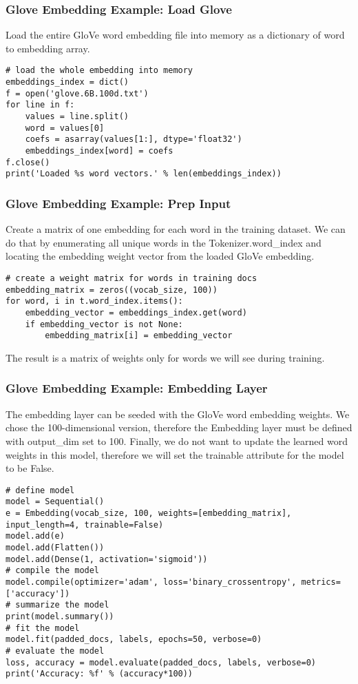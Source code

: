 \begin{frame}[fragile]\frametitle{Glove Embedding Example: Load Glove}

Load the entire GloVe word embedding file into memory as a dictionary of word to embedding array.

\begin{lstlisting}
# load the whole embedding into memory
embeddings_index = dict()
f = open('glove.6B.100d.txt')
for line in f:
	values = line.split()
	word = values[0]
	coefs = asarray(values[1:], dtype='float32')
	embeddings_index[word] = coefs
f.close()
print('Loaded %s word vectors.' % len(embeddings_index))
\end{lstlisting}
\end{frame}

\begin{frame}[fragile]\frametitle{Glove Embedding Example: Prep Input}

Create a matrix of one embedding for each word in the training dataset. We can do that by enumerating all unique words in the Tokenizer.word\_index and locating the embedding weight vector from the loaded GloVe embedding.

\begin{lstlisting}
# create a weight matrix for words in training docs
embedding_matrix = zeros((vocab_size, 100))
for word, i in t.word_index.items():
	embedding_vector = embeddings_index.get(word)
	if embedding_vector is not None:
		embedding_matrix[i] = embedding_vector
\end{lstlisting}

The result is a matrix of weights only for words we will see during training.
\end{frame}

\begin{frame}[fragile]\frametitle{Glove Embedding Example: Embedding Layer}

The embedding layer can be seeded with the GloVe word embedding weights. We chose the 100-dimensional version, therefore the Embedding layer must be defined with output\_dim set to 100. Finally, we do not want to update the learned word weights in this model, therefore we will set the trainable attribute for the model to be False.

\begin{lstlisting}
# define model
model = Sequential()
e = Embedding(vocab_size, 100, weights=[embedding_matrix], input_length=4, trainable=False)
model.add(e)
model.add(Flatten())
model.add(Dense(1, activation='sigmoid'))
# compile the model
model.compile(optimizer='adam', loss='binary_crossentropy', metrics=['accuracy'])
# summarize the model
print(model.summary())
# fit the model
model.fit(padded_docs, labels, epochs=50, verbose=0)
# evaluate the model
loss, accuracy = model.evaluate(padded_docs, labels, verbose=0)
print('Accuracy: %f' % (accuracy*100))
\end{lstlisting}
\end{frame}

